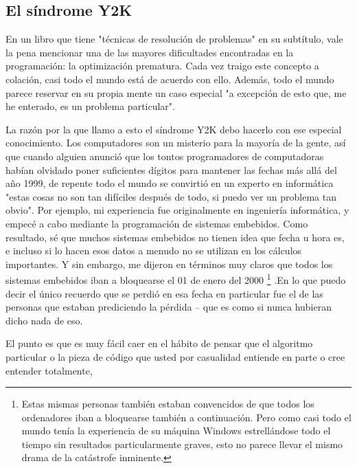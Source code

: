 \newpage

\subsection*{El síndrome Y2K}
\label{sec:y2k}

En un libro que tiene "técnicas de resolución de problemas" en su subtítulo, vale la pena mencionar una de las mayores dificultades encontradas en la programación: la optimización prematura. Cada vez traigo este concepto a colación, casi todo el mundo está de acuerdo con ello. Además, todo el mundo parece reservar en su propia mente un caso especial "a excepción de esto que, me he enterado, es un problema particular". \newline

La razón por la que llamo a esto el síndrome Y2K debo hacerlo con ese especial conocimiento. Los computadores son un misterio para la mayoría de la gente, así que cuando alguien anunció que los tontos programadores de computadoras  habían olvidado poner suficientes dígitos para mantener las fechas más allá del año 1999, de repente todo el mundo se convirtió en un experto en informática \- "estas cosas no son tan difíciles después de todo, si puedo ver un problema tan obvio". Por ejemplo, mi experiencia fue originalmente en ingeniería informática, y empecé a cabo mediante la programación de sistemas embebidos. Como resultado, sé que muchos sistemas embebidos no tienen idea que fecha u hora es, e incluso si lo hacen esos datos a menudo no se utilizan en los cálculos importantes. Y sin embargo, me dijeron en términos muy claros que todos los sistemas embebidos iban a bloquearse el 01 de enero del 2000 \footnote{Estas mismas personas también estaban convencidos de que todos los ordenadores iban a bloquearse también a continuación. Pero como casi todo el mundo tenía la experiencia de su máquina Windows estrellándose todo el tiempo sin resultados particularmente graves, esto no parece llevar el mismo drama de la catástrofe inminente.} %
.En lo que puedo decir el único recuerdo que se perdió en esa fecha en particular fue el de las personas que estaban prediciendo la pérdida –  que es como si nunca hubieran dicho nada de eso.
\newline

El punto es que es muy fácil caer en el hábito de pensar que el algoritmo particular o la pieza de código que usted por casualidad entiende en parte o cree entender totalmente, %

